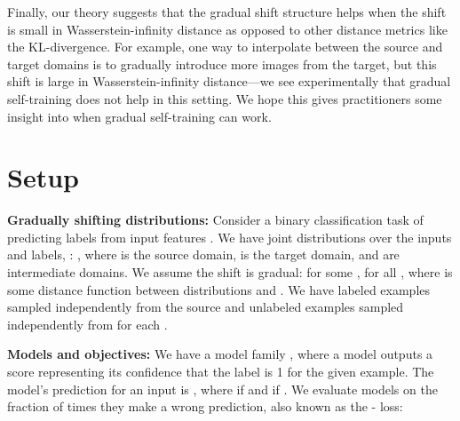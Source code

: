\documentclass[11pt]{article}
\begin{document}
Finally, our theory suggests that the gradual shift structure helps when the shift is small in Wasserstein-infinity distance as opposed to other distance metrics like the KL-divergence.
For example, one way to interpolate between the source and target domains is to gradually introduce more images from the target, but this shift is large in Wasserstein-infinity distance---we see experimentally that gradual self-training does not help in this setting.
We hope this gives practitioners some insight into when gradual self-training can work.
 
\section{Setup}
\label{setup}

\newcommand{\dist}{\ensuremath{\rho}}
\newcommand{\wasser}{\ensuremath{W_{\infty}}}
\newcommand{\xspace}{\ensuremath{\mathbb{R}^d}}
\newcommand{\yspace}{\ensuremath{\{-1, 1\}}}
\newcommand{\error}{\ensuremath{\mbox{Err}}}
\newcommand{\E}[0]{\ensuremath{\mathop{\mathbb{E}}}}
\newcommand{\prob}[0]{\ensuremath{\mathbb{P}}}
\newcommand{\sign}{\ensuremath{\mbox{sign}}}
\newcommand{\selftrain}{\ensuremath{\textup{ST}}}
\newcommand{\linearmodels}{\ensuremath{\Theta}}

\newcommand{\marginphi}{\ensuremath{\phi}}
\newcommand{\ramp}{\ensuremath{r}}
\newcommand{\hinge}{\ensuremath{h}}
\newcommand{\rampl}{\ensuremath{\ell_r}}
\newcommand{\hingel}{\ensuremath{\ell_h}}
\newcommand{\phil}{\ensuremath{\ell_{\phi}}}
\newcommand{\rampL}{\ensuremath{L_r}}
\newcommand{\hingeL}{\ensuremath{L_h}}
\newcommand{\phiL}{\ensuremath{L_{\phi}}}
\newcommand{\reg}{\ensuremath{R}}
\newcommand{\normal}{\ensuremath{\mathcal{N}}}


\textbf{Gradually shifting distributions:} Consider a binary classification task of predicting labels  from input features . 
We have joint distributions over the inputs and labels, : , where  is the source domain,  is the target domain, and  are intermediate domains.
We assume the shift is gradual: for some ,  for all , where  is some distance function between distributions  and .
We have  labeled examples  sampled independently from the source  and  unlabeled examples  sampled independently from  for each .

\textbf{Models and objectives:}
We have a model family , where a model  outputs a score representing its confidence that the label  is 1 for the given example.
The model's prediction for an input  is , where  if  and  if .
We evaluate models on the fraction of times they make a wrong prediction, also known as the - loss:
\end{document}
